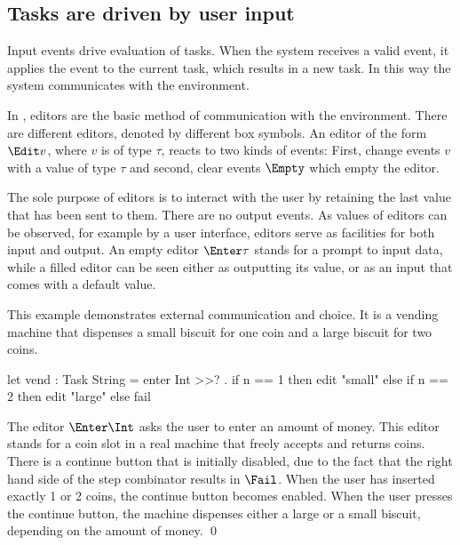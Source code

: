 \subsection{Tasks are driven by user input}


Input events drive evaluation of tasks.
When the system receives a valid event, it applies the event to the current task, which results in a new task.
In this way the system communicates with the environment.

In \TOPHAT, editors are the basic method of communication with the environment.
There are different editors, denoted by different box symbols.
An editor of the form $\Edit v$, where $v$ is of type $\tau$, reacts to two kinds of events:
First, change events $v$ with a value of type $\tau$ and second, clear events $\Empty$ which empty the editor.

The sole purpose of editors is to interact with the user by retaining the last value that has been sent to them.
There are no output events.
As values of editors can be observed, for example by a user interface, editors serve as facilities for both input and output.
An empty editor $\Enter \tau$ stands for a prompt to input data, while a filled editor can be seen either as outputting its value, or as an input that comes with a default value.

\begin{example}
\label{Vending machine}

This example demonstrates external communication and choice.
It is a vending machine that dispenses a small biscuit for one coin and a large biscuit for two coins.
\begin{TASK}
  let vend : Task String = enter Int >>? \n. if n == 1 then edit "small"
    else if n == 2 then edit "large"
    else fail
\end{TASK}
The editor $\Enter \Int$ asks the user to enter an amount of money.
This editor stands for a coin slot in a real machine that freely accepts and returns coins.
There is a continue button that is initially disabled, due to the fact that the right hand side of the step combinator results in $\Fail$.
When the user has inserted exactly 1 or 2 coins, the continue button becomes enabled.
When the user presses the continue button, the machine dispenses either a large or a small biscuit, depending on the amount of money. \qed

\end{example}



